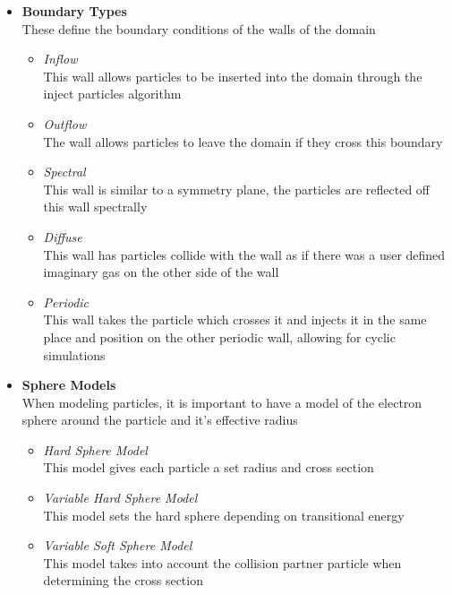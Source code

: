 \begin{itemize}
    \item \textbf{Boundary Types} \\
    These define the boundary conditions of the walls of the domain
    \begin{itemize}
        \item \textit{Inflow} \\
        This wall allows particles to be inserted into the domain through the inject particles algorithm
        \item \textit{Outflow} \\
        The wall allows particles to leave the domain if they cross this boundary
        \item \textit{Spectral}\\
        This wall is similar to a symmetry plane, the particles are reflected off this wall spectrally
        \item \textit{Diffuse}\\
        This wall has particles collide with the wall as if there was a user defined imaginary gas on the other side of the wall
        \item \textit{Periodic} \\
        This wall takes the particle which crosses it and injects it in the same place and position on the other periodic wall, allowing for cyclic simulations
    \end{itemize}
    
    \item \textbf{Sphere Models}\\
    When modeling particles, it is important to have a model of the electron sphere around the particle and it's effective radius
    \begin{itemize}
        \item \textit{Hard Sphere Model}\\
        This model gives each particle a set radius and cross section
        \item \textit{Variable Hard Sphere Model}\\
        This model sets the hard sphere depending on transitional energy
        \item \textit{Variable Soft Sphere Model}\\
        This model takes into account the collision partner particle when determining the cross section
    \end{itemize}
    

\end{itemize}
